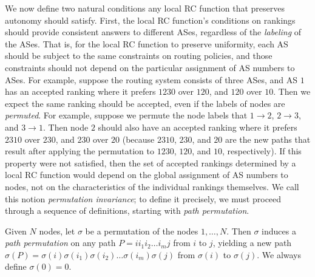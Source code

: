 
We now define two natural conditions any local RC function that preserves
autonomy should satisfy.  First, the local RC function's conditions
on rankings should provide consistent answers to different ASes,
regardless of the {\em labeling} of the ASes. That is, for the
local RC function to preserve uniformity, each AS should be subject to
the same constraints on routing policies, and those constraints should
not depend on the particular assignment of AS numbers to ASes.  For
example, suppose the routing system consists of three ASes, and AS $1$
has an accepted ranking where it prefers $1 2 3 0$ over $1 2 0$, and
$1 2 0$ over $1 0$.  Then we expect the same ranking should be
accepted, even if the labels of nodes are {\em permuted}.  For
example, suppose we permute the node labels that $1 \to 2$, $2 \to 3$,
and $3 \to 1$.  Then node $2$ should also have an accepted ranking
where it prefers $2 3 1 0$ over $2 3 0$, and $2 3 0$ over $2 0$ (because
$2310$, $230$, and $20$ are the new paths that result after applying
the permutation to $1230$, $120$, and $10$, respectively).  If this
property were not satisfied, then the set of accepted rankings
determined by a local RC function would depend on the global assignment of AS
numbers to nodes, not on the characteristics of the individual rankings themselves.
We call this notion {\em permutation invariance}; to define it
precisely, we must proceed through a sequence of definitions, starting
with {\em path permutation}.

\begin{defn}
Given $N$ nodes, let $\sigma$ be a permutation of the nodes
$1,\ldots,N$.  Then $\sigma$ induces a {\em path permutation} on any
path $P = i i_1 i_2 \ldots i_m j$ from $i$ to $j$, yielding a new path
$\sigma(P) = \sigma(i) \sigma(i_1) \sigma(i_2) \ldots \sigma(i_m) \sigma(j)$
from $\sigma(i)$ to $\sigma(j)$.  We always define $\sigma(0) = 0$.
\end{defn}



